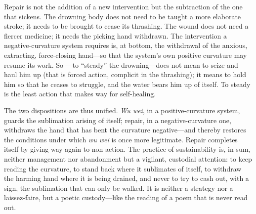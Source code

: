 \begin{claim}
Repair is not the addition of a new intervention but the subtraction of the one that sickens. The drowning body does not need to be taught a more elaborate stroke; it needs to be brought to cease its thrashing. The wound does not need a fiercer medicine; it needs the picking hand withdrawn. The intervention a negative-curvature system requires is, at bottom, the withdrawal of the anxious, extracting, force-closing hand---so that the system's own positive curvature may resume its work.  So ---to ``steady'' the drowning---does not mean to seize and haul him up (that is forced action, complicit in the thrashing); it means to hold him so that he ceases to struggle, and the water bears him up of itself. To steady is the least action that makes way for self-healing.
\end{claim}

The two dispositions are thus unified. \emph{Wu wei}, in a positive-curvature system, guards the sublimation arising of itself; repair, in a negative-curvature one, withdraws the hand that has bent the curvature negative---and thereby restores the conditions under which \emph{wu wei} is once more legitimate. Repair completes itself by giving way again to non-action. The practice of sustainability is, in sum, neither management nor abandonment but a vigilant, custodial attention: to keep reading the curvature, to stand back where it sublimates of itself, to withdraw the harming hand where it is being drained, and never to try to cash out, with a sign, the sublimation that can only be walked. It is neither a strategy nor a laissez-faire, but a poetic custody---like the reading of a poem that is never read out.
